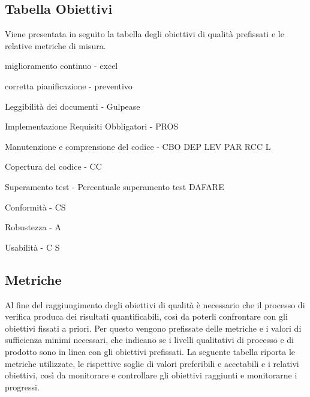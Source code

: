 \subsection{Tabella Obiettivi}
Viene presentata in seguito la tabella degli obiettivi di qualità prefissati e le relative metriche di misura.

miglioramento continuo - excel

corretta pianificazione - preventivo

Leggibilità dei documenti - Gulpease

Implementazione Requisiti Obbligatori - PROS

Manutenzione e comprensione del codice - CBO DEP LEV PAR RCC L

Copertura del codice - CC 

Superamento test - Percentuale superamento test DAFARE

Conformità - CS

Robustezza - A

Usabilità - C S

\subsection{Metriche}
Al fine del raggiungimento degli obiettivi di qualità è necessario che il processo di verifica produca dei risultati quantificabili, così da poterli confrontare con gli obiettivi fissati a priori. Per questo vengono prefissate delle metriche e i valori di sufficienza minimi necessari, che indicano se i livelli qualitativi di processo e di prodotto sono in linea con gli obiettivi prefissati. La seguente tabella riporta le metriche utilizzate, le rispettive soglie di valori preferibili e accetabili e i relativi obiettivi, così da monitorare e controllare gli obiettivi raggiunti e monitorarne i progressi.

